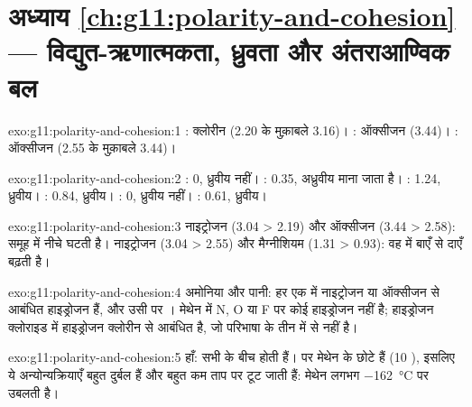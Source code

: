 \section*{अध्याय \ref{ch:g11:polarity-and-cohesion} --- विद्युत-ऋणात्मकता, ध्रुवता और अंतराआण्विक बल}

\begin{solution}{exo:g11:polarity-and-cohesion:1}
: क्लोरीन (2.20 के मुक़ाबले 3.16)। : ऑक्सीजन (3.44)।
: ऑक्सीजन (2.55 के मुक़ाबले 3.44)।
\end{solution}

\begin{solution}{exo:g11:polarity-and-cohesion:2}
: 0, ध्रुवीय नहीं। : 0.35, अध्रुवीय माना जाता है। :
1.24, ध्रुवीय। : 0.84, ध्रुवीय। : 0, ध्रुवीय नहीं। :
0.61, ध्रुवीय।
\end{solution}

\begin{solution}{exo:g11:polarity-and-cohesion:3}
नाइट्रोजन (3.04 > 2.19) और ऑक्सीजन (3.44 > 2.58): 
समूह में नीचे घटती है। नाइट्रोजन (3.04 > 2.55) और मैग्नीशियम
(1.31 > 0.93): वह  में बाएँ से दाएँ बढ़ती है।
\end{solution}

\begin{solution}{exo:g11:polarity-and-cohesion:4}
अमोनिया और पानी: हर एक में नाइट्रोजन या ऑक्सीजन से आबंधित हाइड्रोजन  हैं,
और उसी  पर । मेथेन में N, O या F पर कोई हाइड्रोजन नहीं है;
हाइड्रोजन क्लोराइड में हाइड्रोजन क्लोरीन से आबंधित है, जो परिभाषा के तीन  में
से नहीं है।
\end{solution}

\begin{solution}{exo:g11:polarity-and-cohesion:5}
हाँ:  सभी  के बीच होती हैं। पर मेथेन के
 छोटे हैं (10 ), इसलिए ये अन्योन्यक्रियाएँ बहुत दुर्बल हैं
और बहुत कम ताप पर टूट जाती हैं: मेथेन लगभग
\qty{-162}{\celsius} पर उबलती है।
\end{solution}

